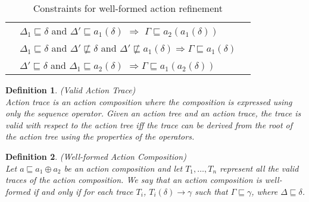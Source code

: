 \documentclass[12pt,journal,letterpaper,onecolumn]{IEEEtran}
\newtheorem{definition}{Definition}[section]
\begin{document}
\begin{table}[h]
\begin{center}
\begin{minipage}{6in}
\begin{center}
\begin{tabular}{|p{3.2cm}|llll|}
 &\multicolumn{3}{l}{$\Delta_1 \sqsubseteq \delta$ and
$ \Delta' \sqsubseteq a_1(\delta)$ $\Rightarrow$ $\Gamma \sqsubseteq a_2(a_1(\delta))$} & \\


 &\multicolumn{3}{l}{$ \Delta_1 \sqsubseteq \delta$ and $\Delta'
\not \sqsubseteq \delta$ and $\Delta' \not \sqsubseteq a_1(\delta)
\Rightarrow \Gamma
\sqsubseteq a_1(\delta)$} & \\


&\multicolumn{3}{l}{$\Delta' \sqsubseteq \delta$ and $\Delta_1
\sqsubseteq a_2(\delta)$ $\Rightarrow \Gamma \sqsubseteq
a_1(a_2(\delta))$} & \\


 \hline
\end{tabular}
\end{center}
\normalsize
\end{minipage}
\caption{Constraints for well-formed action refinement}
\label{table:refine}
\end{center}
\end{table}



\begin{definition}(Valid Action Trace)\\
Action trace is an action composition where the composition is
expressed using only the sequence operator. Given an action tree and
an action trace, the trace is valid with respect to the action tree
iff the trace can be derived from the root of the action tree using
the properties of the operators.
\end{definition}

\begin{definition}(Well-formed Action Composition)\\
Let $a \sqsubseteq a_1 \oplus a_2$ be an action composition and let
$T_1, \ldots, T_n$ represent all the valid traces of the action
composition. We say that an action composition is well-formed if and
only if for each trace $T_i$, $T_i(\delta)\rightarrow \gamma$ such
that $\Gamma \sqsubseteq \gamma$, where $\Delta \sqsubseteq \delta$.
\label{def:well-formed}
\end{definition}
\end{document}
